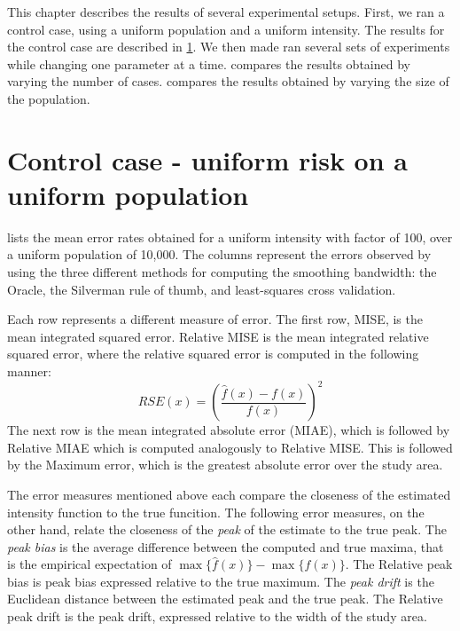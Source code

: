 
This chapter describes the results of several experimental setups.
First, we ran a control case, using a uniform population and a uniform intensity.
The results for the control case are described in \cref{sec:results:unif_100_unif}.
We then made ran several sets of experiments while changing one parameter at a time.
 compares the results obtained by varying the number of cases.
 compares the results obtained by varying the size of the population.


\section{Control case - uniform risk on a uniform population}
\label{sec:results:unif_100_unif}

 lists the mean error rates obtained for a uniform intensity with factor of 100, over a uniform population of 10,000.
The columns represent the errors observed by using the three different methods for computing the smoothing bandwidth:
the Oracle, the Silverman rule of thumb, and least-squares cross validation.

Each row represents a different measure of error.
The first row, MISE, is the mean integrated squared error.
Relative MISE is the mean integrated relative squared error, where the relative squared error is computed in the following manner:
\[ RSE(x) = \left(\frac{\hat{f}(x)-f(x)}{f(x)}\right)^2 \]
The next row is the mean integrated absolute error (MIAE), which is followed by Relative MIAE which is computed analogously to Relative MISE.
This is followed by the Maximum error, which is the greatest absolute error over the study area.

The error measures mentioned above each compare the closeness of the estimated intensity function to the true funcition.
The following error measures, on the other hand, relate the closeness of the \textit{peak} of the estimate to the true peak.
The \textit{peak bias} is the average difference between the computed and true maxima, that is the empirical expectation of \(\max{\{\hat{f}(x)\}} - \max{\{f(x)\}}\).
The Relative peak bias is peak bias expressed relative to the true maximum.
The \textit{peak drift} is the Euclidean distance between the estimated peak and the true peak.
The Relative peak drift is the peak drift, expressed relative to the width of the study area.

